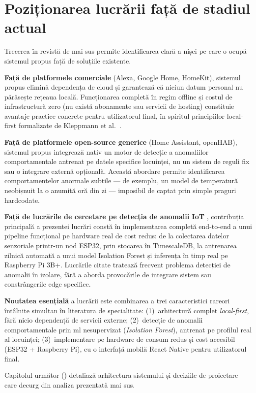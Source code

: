 \section{Poziționarea lucrării față de stadiul actual}
\label{sec:studii-pozitionare}

Trecerea în revistă de mai sus permite identificarea clară a nișei pe care o ocupă
sistemul propus față de soluțiile existente.

\textbf{Față de platformele comerciale} (Alexa, Google Home, HomeKit), sistemul propus
elimină dependența de cloud și garantează că niciun datum personal nu părăsește rețeaua
locală. Funcționarea completă în regim offline și costul de infrastructură zero (nu există
abonamente sau servicii de hosting) constituie avantaje practice concrete pentru utilizatorul
final, în spiritul principiilor local-first formalizate de Kleppmann et al.\
\cite{kleppmann2019localfirst}.

\textbf{Față de platformele open-source generice} (Home Assistant, openHAB), sistemul
propus integrează nativ un motor de detecție a anomaliilor comportamentale antrenat pe
datele specifice locuinței, nu un sistem de reguli fix sau o integrare externă opțională.
Această abordare permite identificarea comportamentelor anormale subtile — de exemplu, un
model de temperatură neobișnuit la o anumită oră din zi — imposibil de captat prin simple
praguri hardcodate.

\textbf{Față de lucrările de cercetare pe detecția de anomalii IoT} \cite{cook2020anomalyiot,
fahim2019anomaly}, contribuția principală a prezentei lucrări constă în implementarea
completă end-to-end a unui pipeline funcțional pe hardware real de cost redus: de la
colectarea datelor senzoriale printr-un nod ESP32, prin stocarea în TimescaleDB, la
antrenarea zilnică automată a unui model Isolation Forest și inferența în timp real pe
Raspberry Pi 3B+. Lucrările citate tratează frecvent problema detecției de anomalii
în izolare, fără a aborda provocările de integrare sistem sau constrângerile edge specifice.

\textbf{Noutatea esențială} a lucrării este combinarea a trei caracteristici rareori
întâlnite simultan în literatura de specialitate: (1)~arhitectură complet \emph{local-first},
fără nicio dependență de servicii externe; (2)~detecție de anomalii comportamentale
prin \gls{ml} nesupervizat (\emph{Isolation Forest}), antrenat pe profilul real al
locuinței; (3)~implementare pe hardware de consum redus și cost accesibil (ESP32 + Raspberry
Pi), cu o interfață mobilă React Native pentru utilizatorul final.

Capitolul următor () detaliază arhitectura sistemului și
deciziile de proiectare care decurg din analiza prezentată mai sus.
